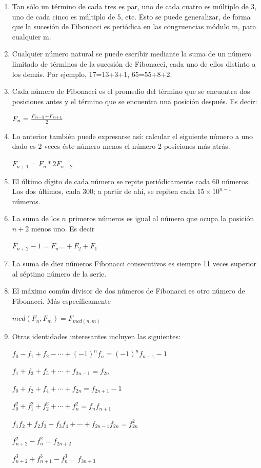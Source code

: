 \begin{enumerate}
	\item Tan sólo un término de cada tres es par, uno de cada cuatro es múltiplo de 3, uno de cada cinco es múltiplo de 5, etc. Esto se puede generalizar, de forma que la sucesión de Fibonacci es periódica en las congruencias módulo m, para cualquier m.
	
	
	\item Cualquier número natural se puede escribir mediante la suma de un número limitado de términos de la sucesión de Fibonacci, cada uno de ellos distinto a los demás. Por ejemplo, 17=13+3+1, 65=55+8+2.
	
	\item Cada número de Fibonacci es el promedio del término que se encuentra dos posiciones antes y el término que se encuentra una posición después. Es decir:
	
	$ F_{n} = { F_{n-2} + F_{n+1}  \over 2}$
	
	\item Lo anterior también puede expresarse así: calcular el siguiente número a uno dado es 2 veces éste número menos el número 2 posiciones más atrás.
	
	$F_{n+1} = F_{n} * 2 F_{n-2}$
	
	\item El último dígito de cada número se repite periódicamente cada 60 números. Los dos últimos, cada 300; a partir de ahí, se repiten cada $15\times10^{n-1}$ números.
	
	\item La suma de los $n$ primeros números es igual al número que ocupa la posición $n+2$ menos uno. Es decir
	
	$F_{n+2}-1 = F_{n} ... +F_{2}+F_{1}$
	
	\item  La suma de diez números Fibonacci consecutivos es siempre 11 veces superior al séptimo número de la serie.
	
	\item  El máximo común divisor de dos números de Fibonacci es otro número de Fibonacci. Más específicamente
	
	$mcd(F_{n},F_{m}) = F_{mcd(n,m)}$
	
	\item Otras identidades interesantes incluyen las siguientes:
	
	$f_0-f_1+f_2-\cdots+(-1)^nf_n=(-1)^nf_{n-1}-1$
	
	$f_1+f_3+f_5+\cdots+f_{2n-1}=f_{2n}$
	
	$f_0+f_2+f_4+\cdots+f_{2n}=f_{2n+1}-1$
	
	$f_0^2+f_1^2+f_2^2+\cdots+f_n^2=f_nf_{n+1}$
	
	$f_1f_2+f_2f_3+f_3f_4+\cdots+f_{2n-1}f_{2n}=f_{2n}^2$
	
	
	$f_{n+2}^2-f_n^2=f_{2n+2}$
	
	$f_{n+2}^3+f_{n+1}^3-f_n^3=f_{3n+3}$
	
	
	
\end{enumerate}